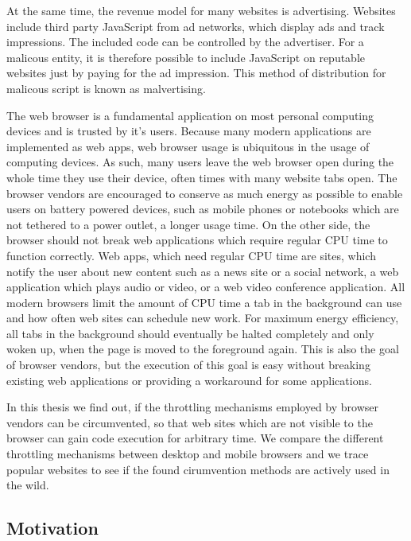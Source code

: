 \documentclass[article,type=bsc,colorback,accentcolor=tud9c]{tudthesis}
\begin{document}
  At the same time, the revenue model for many websites is advertising. Websites include third party JavaScript from ad networks, which display ads and track impressions. The included code can be controlled by the advertiser. For a malicous entity, it is therefore possible to include JavaScript on reputable websites just by paying for the ad impression. This method of distribution for malicous script is known as malvertising\cite{wiki:malvertising}.

  The web browser is a fundamental application on most personal computing devices and is trusted by it's users. Because many modern applications are implemented as web apps, web browser usage is ubiquitous in the usage of computing devices. As such, many users leave the web browser open during the whole time they use their device, often times with many website tabs open. The browser vendors are encouraged to conserve as much energy as possible to enable users on battery powered devices, such as mobile phones or notebooks which are not tethered to a power outlet, a longer usage time. On the other side, the browser should not break web applications which require regular CPU time to function correctly. Web apps, which need regular CPU time are sites, which notify the user about new content such as a news site or a social network, a web application which plays audio or video, or a web video conference application. All modern browsers limit the amount of CPU time a tab in the background can use and how often web sites can schedule new work. For maximum energy efficiency, all tabs in the background should eventually be halted completely and only woken up, when the page is moved to the foreground again. This is also the goal of browser vendors\cite{chrome-background-tabs-roadmap}, but the execution of this goal is easy without breaking existing web applications or providing a workaround for some applications.

  In this thesis we find out, if the throttling mechanisms employed by browser vendors can be circumvented, so that web sites which are not visible to the browser can gain code execution for arbitrary time. We compare the different throttling mechanisms between desktop and mobile browsers and we trace popular websites to see if the found cirumvention methods are actively used in the wild.
  
  \subsection{Motivation}
\end{document}
